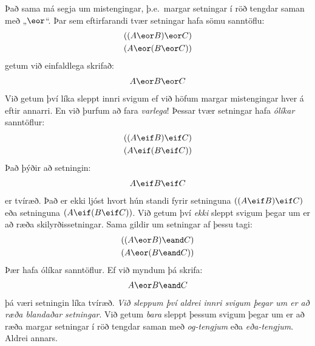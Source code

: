 Það sama má segja um mistengingar, þ.e.\ margar setningar í röð tengdar saman með „$\eor$“. Þar sem eftirfarandi tvær setningar hafa sömu sanntöflu:
	\begin{align*}
		((A \eor B) \eor C)\\
		(A \eor (B \eor C))
	\end{align*}
getum við einfaldlega skrifað:
	\begin{align*}
		A \eor B \eor C
	\end{align*}
Við getum því líka sleppt innri svigum ef við höfum margar mistengingar hver á eftir annarri. En við þurfum að fara \emph{varlega}! Þessar tvær setningar hafa \emph{ólíkar} sanntöflur:
	\begin{align*}
		((A \eif B) \eif C)\\
		(A \eif (B \eif C))
	\end{align*}
Það þýðir að setningin:
	\begin{align*}
		A \eif B \eif C
	\end{align*}
er tvíræð. Það er ekki ljóst hvort hún standi fyrir setninguna $((A \eif B) \eif C)$ eða setninguna $(A \eif (B \eif C))$. Við getum því \emph{ekki} sleppt svigum þegar um er að ræða skilyrðissetningar. Sama gildir um setningar af þessu tagi:
	\begin{align*}
		((A \eor B) \eand C)\\
		(A \eor (B \eand C))
	\end{align*}
Þær hafa ólíkar sanntöflur. Ef við myndum þá skrifa:
	\begin{align*}
		A \eor B \eand C
	\end{align*}
þá væri setningin líka tvíræð. \emph{Við sleppum því aldrei innri svigum þegar um er að ræða blandaðar setningar}. Við getum \emph{bara} sleppt þessum svigum þegar um er að ræða margar setningar í röð tengdar saman með \emph{og-tengjum} eða \emph{eða-tengjum}. Aldrei annars.

